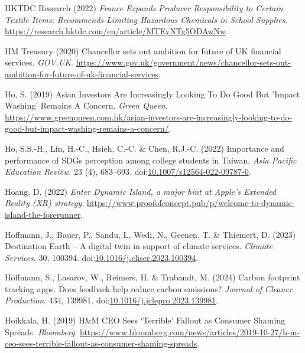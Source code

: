 \documentclass[
  letterpaper,
  DIV=11,
  numbers=noendperiod]{scrartcl}
\newlength{\cslhangindent}
\newenvironment{CSLReferences}[2] %
 {\begin{list}{}{%
  \setlength{\itemindent}{0pt}
  \setlength{\leftmargin}{0pt}
  \setlength{\parsep}{0pt}
  \ifodd #1
   \setlength{\leftmargin}{\cslhangindent}
   \setlength{\itemindent}{-1\cslhangindent}
  \fi
  \setlength{\itemsep}{#2\baselineskip}}}
 {\end{list}}
\begin{document}
\begin{CSLReferences}{0}{1}
HKTDC Research (2022) \emph{France {Expands Producer Responsibility} to
{Certain Textile Items}; {Recommends Limiting Hazardous Chemicals} in
{School Supplies}}.
\url{https://research.hktdc.com/en/article/MTEyNTg5ODAwNw}.

HM Treasury (2020) Chancellor sets out ambition for future of {UK}
financial services. \emph{GOV.UK}.
\url{https://www.gov.uk/government/news/chancellor-sets-out-ambition-for-future-of-uk-financial-services}.

Ho, S. (2019) Asian {Investors Are Increasingly Looking To Do Good But}
'{Impact Washing}' {Remains A Concern}. \emph{Green Queen}.
\url{https://www.greenqueen.com.hk/asian-investors-are-increasingly-looking-to-do-good-but-impact-washing-remains-a-concern/}.

Ho, S.S.-H., Lin, H.-C., Hsieh, C.-C. \& Chen, R.J.-C. (2022) Importance
and performance of {SDGs} perception among college students in {Taiwan}.
\emph{Asia Pacific Education Review}. 23 (4), 683--693.
doi:\href{https://doi.org/10.1007/s12564-022-09787-0}{10.1007/s12564-022-09787-0}.

Hoang, D. (2022) \emph{Enter {Dynamic Island}, a major hint at {Apple}'s
{Extended Reality} ({XR}) strategy}.
\url{https://www.proofofconcept.pub/p/welcome-to-dynamic-island-the-forerunner}.

Hoffmann, J., Bauer, P., Sandu, I., Wedi, N., Geenen, T. \& Thiemert, D.
(2023) Destination {Earth} -- {A} digital twin in support of climate
services. \emph{Climate Services}. 30, 100394.
doi:\href{https://doi.org/10.1016/j.cliser.2023.100394}{10.1016/j.cliser.2023.100394}.

Hoffmann, S., Lasarov, W., Reimers, H. \& Trabandt, M. (2024) Carbon
footprint tracking apps. {Does} feedback help reduce carbon emissions?
\emph{Journal of Cleaner Production}. 434, 139981.
doi:\href{https://doi.org/10.1016/j.jclepro.2023.139981}{10.1016/j.jclepro.2023.139981}.

Hoikkala, H. (2019) H\&{M CEO Sees} {`{Terrible}'} {Fallout} as
{Consumer Shaming Spreads}. \emph{Bloomberg}.
\url{https://www.bloomberg.com/news/articles/2019-10-27/h-m-ceo-sees-terrible-fallout-as-consumer-shaming-spreads}.


\end{CSLReferences}
\end{document}

